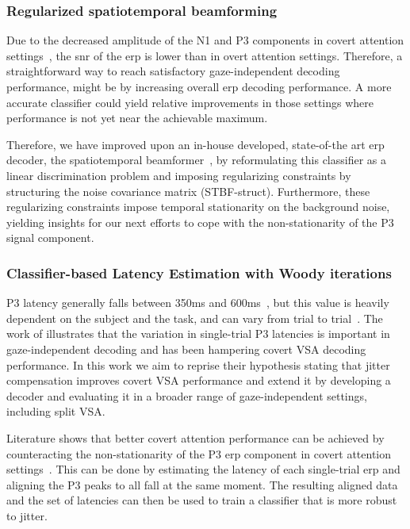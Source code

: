 \subsubsection{Regularized spatiotemporal beamforming}
Due to the decreased amplitude of the N1 and P3 components in covert attention
settings~\cite{Treder2010}, the \ac{snr} of
the \ac{erp} is lower than in overt attention settings.
Therefore, a straightforward way to reach satisfactory
gaze-independent decoding performance, might be by increasing overall \ac{erp}
decoding performance. A more accurate classifier could yield relative
improvements in those settings where performance is not yet near the achievable
maximum.

Therefore, we have improved upon an in-house developed, state-of-the art \ac{erp}
decoder, the spatiotemporal beamformer~\cite{Wittevrongel2016}, by reformulating
this classifier as a linear discrimination problem and
imposing regularizing constraints by structuring the noise covariance matrix
(STBF-struct).
Furthermore, these regularizing constraints impose temporal stationarity on
the background noise, yielding insights for our next
efforts to cope with the non-stationarity of the P3 signal component.

\subsubsection{Classifier-based Latency Estimation with Woody iterations}

P3 latency generally falls between 350ms and 600ms~\cite{Luck2014}, but this
value is heavily dependent on the subject and the task, and can vary from trial
to trial~\cite{Ouyang2017}.
The work of \cite{Arico2014} illustrates that the variation in single-trial P3
latencies is important in gaze-independent decoding and has been hampering covert
VSA decoding performance.
In this work we aim to reprise their hypothesis stating that jitter compensation improves
covert VSA performance and extend it by developing a decoder and evaluating it
in a broader range of gaze-independent settings, including split VSA.


Literature shows that better covert attention performance can be achieved by
counteracting the non-stationarity of the P3 \ac{erp} component in covert
attention settings~\cite{Arico2014}.
This can be done by estimating the latency of each single-trial \ac{erp} and aligning
the P3 peaks to all fall at the same moment.
The resulting aligned data and the set of latencies can then be used to train a
classifier that is more robust to jitter.

